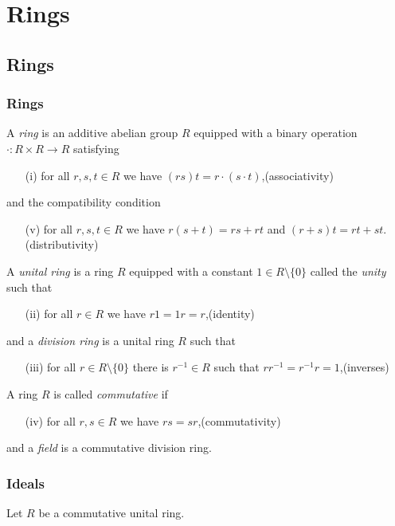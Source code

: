 \documentclass{../../large}
\begin{document}
\part{Rings}
\chapter{Rings}
\section{Rings}
\begin{prb}[Rings]
A \emph{ring} is an additive abelian group $R$ equipped with a binary operation $\cdot:R\times R\to R$ satisfying
\begin{enumerate}
\item[(i)] for all $r,s,t\in R$ we have $(rs)t=r\cdot(s\cdot t)$,\hfill(associativity)
\end{enumerate}
and the compatibility condition
\begin{enumerate}
\item[(v)] for all $r,s,t\in R$ we have $r(s+t)=rs+rt$ and $(r+s)t=rt+st$.\hfill(distributivity)
\end{enumerate}
A \emph{unital ring} is a ring $R$ equipped with a constant $1\in R\setminus\{0\}$ called the \emph{unity} such that
\begin{enumerate}
\item[(ii)] for all $r\in R$ we have $r1=1r=r$,\hfill(identity)
\end{enumerate}
and a \emph{division ring} is a unital ring $R$ such that
\begin{enumerate}
\item[(iii)] for all $r\in R\setminus\{0\}$ there is $r^{-1}\in R$ such that $rr^{-1}=r^{-1}r=1$,\hfill(inverses)
\end{enumerate}
A ring $R$ is called \emph{commutative} if
\begin{enumerate}
\item[(iv)] for all $r,s\in R$ we have $rs=sr$,\hfill(commutativity)
\end{enumerate}
and a \emph{field} is a commutative division ring.
\end{prb}

\section{Ideals}

\begin{prb}[Ideals]
Let $R$ be a commutative unital ring.
\end{prb}
\end{document}
